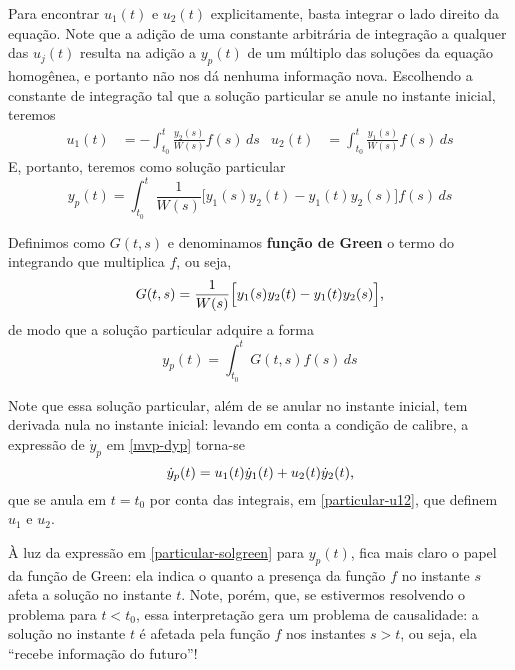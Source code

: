 \documentclass[12pt,a4paper,oneside]{memoir}
\begin{document}
Para encontrar $u_1(t)$ e $u_2(t)$ explicitamente, basta integrar o lado direito da equação.  Note que a adição de uma constante arbitrária de integração a qualquer das $u_j(t)$ resulta na adição a $y_p(t)$ de um múltiplo das soluções da equação homogênea, e portanto não nos dá nenhuma informação nova.  Escolhendo a constante de integração tal que a solução particular se anule no instante inicial, teremos
\begin{align}
\label{particular-u12}
  u_1(t) &= -\int_{t_0}^{t} \frac{y_2(s)}{W(s)} f(s)\,ds &
  u_2(t) &= \int_{t_0}^{t} \frac{y_1(s)}{W(s)} f(s)\,ds
\end{align}
E, portanto, teremos como solução particular
\begin{equation}
  y_p(t) =
    \int_{t_0}^{t}
      \frac{1}{W(s)} \Big[
        y_1(s) y_2(t) - y_1(t) y_2(s) \Big]
      f(s)\,ds
\end{equation}

Definimos como $G(t, s)$ e denominamos \textbf{função de Green} o termo do integrando que multiplica $f$, ou seja,
\begin{equation}
\label{particular-green}
  G(t, s) = \frac{1}{W(s)} \Big[ y_1(s) y_2(t) - y_1(t) y_2(s) \Big] \text,
\end{equation}
de modo que a solução particular adquire a forma
\begin{equation}
\label{particular-solgreen}
  y_p(t) = \int_{t_0}^{t} G(t, s) f(s)\,ds
\end{equation}

Note que essa solução particular, além de se anular no instante inicial, tem derivada nula no instante inicial: levando em conta a condição de calibre, a expressão de $\dot{y}_p$ em \eqref{mvp-dyp} torna-se
\begin{equation}
\label{particular-deriv1}
  \dot{y}_p(t) = u_1(t) \dot{y}_1(t) + u_2(t) \dot{y}_2(t) \text,
\end{equation}
que se anula em $t = t_0$ por conta das integrais, em \eqref{particular-u12}, que definem $u_1$ e $u_2$.


À luz da expressão em \eqref{particular-solgreen} para $y_p(t)$, fica mais claro o papel da função de Green: ela indica o quanto a presença da função $f$ no instante $s$ afeta a solução no instante $t$.  Note, porém, que, se estivermos resolvendo o problema para $t < t_0$, essa interpretação gera um problema de causalidade: a solução no instante $t$ é afetada pela função $f$ nos instantes $s > t$, ou seja, ela ``recebe informação do futuro''!
\end{document}
